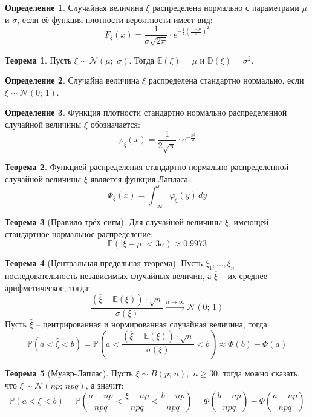\documentclass[12pt]{article}
\theoremstyle{definition}
\newtheorem{theorem}{Теорема}[section]
\newtheorem{definition}{Определение}
\newcommand{\E}{\mathbb{E}}
\newcommand{\D}{\mathbb{D}}
\newcommand{\prob}{\mathbb{P}}
\newcommand{\nd}{\mathcal{N}}
\begin{document}
\begin{definition}
    Случайная величина $\xi$ распределена нормально с параметрами $\mu$ и $\sigma$, если её функция плотности вероятности имеет вид:
    $$F_\xi(x)=\frac{1}{\sigma\sqrt{2\pi}}\cdot e^{-\frac{1}{2}\left(\frac{x-\mu}{\sigma}\right)^2}$$
\end{definition}
\begin{theorem}
    Пусть $\xi\sim\mathcal{N}(\mu;\,\,\sigma)$. Тогда $\E(\xi)=\mu$ и $\D(\xi)=\sigma^2$.
\end{theorem}
\begin{definition}
    Случайна величина $\xi$ распределена стандартно нормально, если $\xi\sim\nd(0;\,1)$.
\end{definition}
\begin{definition}
    Функция плотности стандартно нормально распределенной случайной величины $\xi$ обозначается:
    $$\varphi_\xi(x)=\frac{1}{2\sqrt{\pi}}\cdot e^{-\frac{x^2}{2}}$$
\end{definition}
\begin{theorem}
    Функцией распределения стандартно нормально распределенной случайной величины $\xi$ является функция Лапласа:
    $$\Phi_\xi(x)=\int_{-\infty}^{x}\varphi_\xi(y)\, dy $$
\end{theorem}
\begin{theorem}[Правило трёх сигм]
    Для случайной величины $\xi$, имеющей стандартное нормальное распределение:
    $$\prob(|\xi-\mu|<3\sigma)\approx\num{0.9973}$$
\end{theorem}
\begin{theorem}[Центральная предельная теорема]
    Пусть $\xi_1,\ldots,\xi_n$ – последовательность независимых случайных величин, а $\overline{\xi}$ – их среднее арифметическое, тогда:
    $$\frac{\left(\overline{\xi}-\E(\xi)\right)\cdot \sqrt{n}}{\sigma(\xi)}\xrightarrow{n\to\infty}\nd(0;\,1)$$
    Пусть $\hat{\xi}$ – центрированная и нормированная случайная величина, тогда: 
    $$\prob(a<\hat{\xi}<b)=\prob\left(a<\frac{\left(\overline{\xi}-\E(\xi)\right)\cdot \sqrt{n}}{\sigma(\xi)}<b\right)\approx\Phi(b)-\Phi(a)$$
\end{theorem}
\begin{theorem}[Муавр-Лаплас]
    Пусть $\xi\sim B(p;\,n),\,\,n\geq30$, тогда можно сказать, что $\xi\sim\nd(np;\,npq)$, а значит:
    $$\prob(a<\xi<b)=\prob\left(\frac{a-np}{npq}<\frac{\xi-np}{npq}<\frac{b-np}{npq}\right)=\Phi\left(\frac{b-np}{npq}\right)-\Phi\left(\frac{a-np}{npq}\right)$$
\end{theorem}
\end{document}
